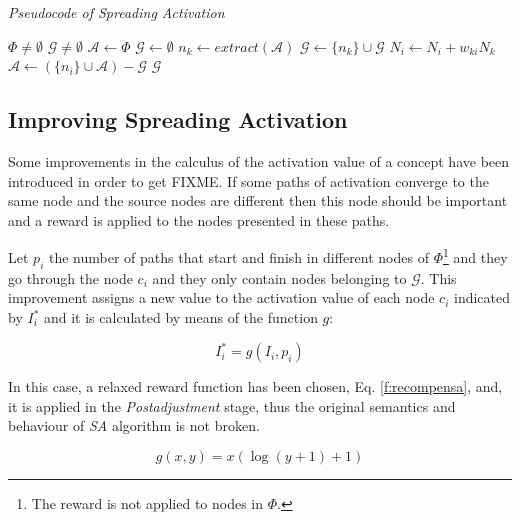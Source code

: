 \documentclass{llncs}
\begin{document}
\begin{algorithm}
\caption{\textit{Pseudocode of Spreading Activation}}
\label{alg:as}
\begin{algorithmic}
  \REQUIRE $\Phi \neq \emptyset$  
  \ENSURE $\mathcal{G} \neq \emptyset$
  \STATE $\mathcal{A} \leftarrow \Phi$
  \STATE $\mathcal{G} \leftarrow \emptyset$
	\STATE $n_k \leftarrow  extract(\mathcal{A})$
	\STATE $\mathcal{G} \leftarrow \{n_k\} \cup \mathcal{G}$	  	
	  	\STATE $N_i \leftarrow N_i + w_{ki}N_k$	
		\STATE $\mathcal{A} \leftarrow (\{n_i\} \cup \mathcal{A}) -
\mathcal{G}$		
	    \ENDFOR
  \ENDWHILE
 \RETURN $\mathcal{G}$
\end{algorithmic}
\end{algorithm}\label{alg:as}

\subsection{Improving Spreading Activation}\label{improve:sa}
Some improvements in the calculus of the activation value of a
concept have been introduced in order to get FIXME. If some paths of activation converge to the same node and the
source nodes are different then this node should be important and a reward is applied to the nodes presented
in these paths. 

\begin{definition}
Let $p_i$ the number of paths that start and finish in different nodes of
$\Phi$\footnote{The reward is not applied to nodes in  $\Phi$.} and they go
through the node $c_i$ and they only contain nodes belonging to $\mathcal{G}$.
This improvement assigns a new value to the activation value of each node $c_i$
indicated by $I^*_i$ and it is calculated by means of the function $g$:
\end{definition}

\begin{equation}
I^*_i = g(I_i,p_i)
\end{equation}

In this case, a relaxed reward function has been chosen, Eq. \ref{f:recompensa},
and, it is applied in the \textit{Postadjustment} stage, thus the
original semantics and behaviour of \textit{SA} algorithm is not broken. 

\begin{equation}\label{f:recompensa}
g(x,y) = x (\log(y+1)+1)
\end{equation}
\end{document}
